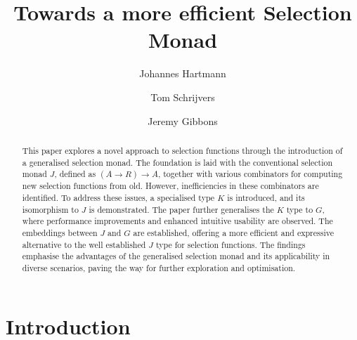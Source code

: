 \documentclass[runningheads]{llncs}
\newcommand{\ignore}[1]{}
\begin{document}
\title{Towards a more efficient Selection Monad}

\author{
    Johannes Hartmann \and 
    Tom Schrijvers\and 
    Jeremy Gibbons
}
%


%
\maketitle              %
%
\begin{abstract}
This paper explores a novel approach to selection functions through the
introduction of a generalised selection monad. The foundation is laid
with the conventional selection monad \(J\), defined as
\((A \rightarrow R) \rightarrow A\), together with various combinators
for computing new selection functions from old. However, inefficiencies
in these combinators are identified. To address these issues, a
specialised type \(K\) is introduced, and its isomorphism to \(J\) is
demonstrated. The paper further generalises the \(K\) type to \(G\),
where performance improvements and enhanced intuitive usability are
observed. The embeddings between \(J\) and \(G\) are established,
offering a more efficient and expressive alternative to the well
established \(J\) type for selection functions. The findings emphasise
the advantages of the generalised selection monad and its applicability
in diverse scenarios, paving the way for further exploration and
optimisation.

\end{abstract}
%
%
%
\ignore{

> {-# LANGUAGE ImpredicativeTypes #-}
> {-# LANGUAGE ScopedTypeVariables #-}

> import Prelude hiding ((>>=), return, pure, (<*>), fmap, sequence, pred)
> import Data.Function (on)
> import Data.List
> import Debug.Trace  

}

\section{Introduction}\label{introduction}
\end{document}
